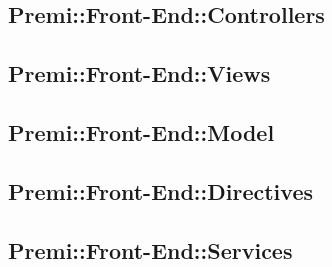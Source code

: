 		\subsection{Premi::Front-End::Controllers}
			
			\newpage

		\subsection{Premi::Front-End::Views}
			
			\newpage
					
		\subsection{Premi::Front-End::Model}
			
			\newpage

		\subsection{Premi::Front-End::Directives}
			
			\newpage

		\subsection{Premi::Front-End::Services}
			
			\newpage
